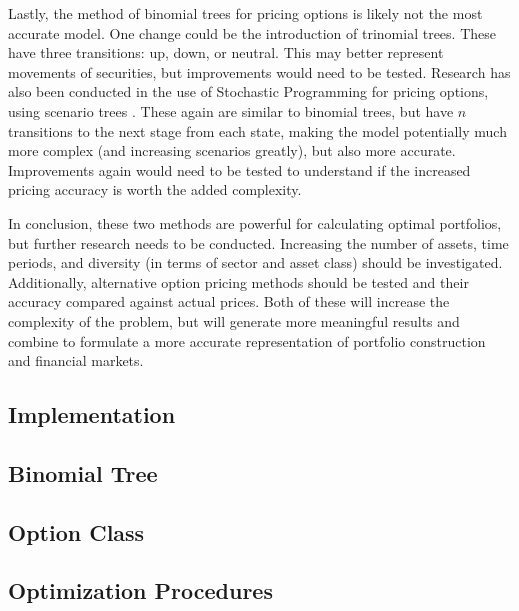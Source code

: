 \documentclass[12pt]{article}
\begin{document}
Lastly, the method of binomial trees for pricing options is likely not the most accurate model. One change could be the introduction of trinomial trees. These have three transitions: up, down, or neutral. This may better represent movements of securities, but improvements would need to be tested. Research has also been conducted in the use of Stochastic Programming for pricing options, using scenario trees \cite{stoc_prog_option}. These again are similar to binomial trees, but have $n$ transitions to the next stage from each state, making the model potentially much more complex (and increasing scenarios greatly), but also more accurate. Improvements again would need to be tested to understand if the increased pricing accuracy is worth the added complexity.

In conclusion, these two methods are powerful for calculating optimal portfolios, but further research needs to be conducted. Increasing the number of assets, time periods, and diversity (in terms of sector and asset class) should be investigated. Additionally, alternative option pricing methods should be tested and their accuracy compared against actual prices. Both of these will increase the complexity of the problem, but will generate more meaningful results and combine to formulate a more accurate representation of portfolio construction and financial markets.


\newpage
{}





\newpage
\begin{appendices}
\section{Implementation} \label{ap:code}
\subsection{Binomial Tree}


\subsection{Option Class}


\subsection{Optimization Procedures}

\end{appendices}
\end{document}
